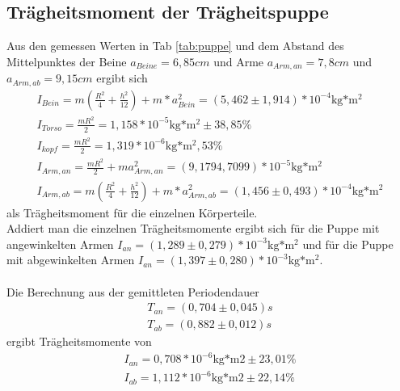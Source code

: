 \subsection{Trägheitsmoment der Trägheitspuppe}

Aus den gemessen Werten in Tab \ref{tab:puppe} und dem Abstand des Mittelpunktes der Beine $a_{Beine}=6,85cm$ und Arme $a_{Arm,an}=7,8cm$ und $a_{Arm,ab}=9,15cm$ ergibt sich
\begin{align}
I_{Bein}=m\left(\frac{R^2}{4}+\frac{h^2}{12}\right)+m*a_{Bein}^2=(5,462\pm1,914)*10^{-4}\text{kg*m$^2$}\\
I_{Torso}=\frac{mR^2}{2}=1,158*10^{-5}\text{kg*m$^2$}\pm38,85\%\\
I_{kopf}=\frac{mR^2}{2}=1,319*10^{-6}\text{kg*m$^2$},53\%\\
I_{Arm,an}=\frac{mR^2}{2}+ma_{Arm,an}^2=(9,1794,7099)*10^{-5}\text{kg*m$^2$}\\
I_{Arm,ab}=m\left(\frac{R^2}{4}+\frac{h^2}{12}\right)+m*a_{Arm,ab}^2=(1,456\pm0,493)*10^{-4}\text{kg*m$^2$}
\end{align}
als Trägheitsmoment für die einzelnen Körperteile.
\\
Addiert man die einzelnen Trägheitsmomente ergibt sich für die Puppe mit angewinkelten Armen $I_{an}=(1,289\pm0,279)*10^{-3}\text{kg*m$^2$}$ und für die Puppe mit abgewinkelten Armen $I_{an}=(1,397\pm0,280)*10^{-3}\text{kg*m$^2$}$.
\\
\\
Die Berechnung aus der gemittleten Periodendauer
\begin{align*}
T_{an}=(0,704\pm0,045)s\\
T_{ab}=(0,882\pm0,012)s
\end{align*}
ergibt Trägheitsmomente von
\begin{align*}
I_{an}=0,708*10^{-6}\text{kg*m2}\pm23,01\%\\
I_{ab}=1,112*10^{-6}\text{kg*m2}\pm22,14\%
\end{align*}